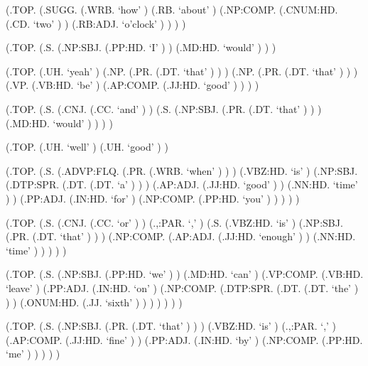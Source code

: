 \documentclass[10pt]{article}
\begin{document}
\begin{parsetree}  (.TOP. (.SUGG. (.WRB. `how' ) (.RB. `about' ) (.NP:COMP. (.CNUM:HD. (.CD. `two' ) ) (.RB:ADJ. `o'clock' ) ) ) ) \end{parsetree}

\begin{parsetree}  (.TOP. (.S. (.NP:SBJ. (.PP:HD. `I' ) ) (.MD:HD. `would' ) ) ) \end{parsetree}

\begin{parsetree}  (.TOP. (.UH. `yeah' ) (.NP. (.PR. (.DT. `that' ) ) ) (.NP. (.PR. (.DT. `that' ) ) ) (.VP. (.VB:HD. `be' ) (.AP:COMP. (.JJ:HD. `good' ) ) ) ) \end{parsetree}

\begin{parsetree}  (.TOP. (.S. (.CNJ. (.CC. `and' ) ) (.S. (.NP:SBJ. (.PR. (.DT. `that' ) ) ) (.MD:HD. `would' ) ) ) ) \end{parsetree}

\begin{parsetree}  (.TOP. (.UH. `well' ) (.UH. `good' ) ) \end{parsetree}

\begin{parsetree}  (.TOP. (.S. (.ADVP:FLQ. (.PR. (.WRB. `when' ) ) ) (.VBZ:HD. `is' ) (.NP:SBJ. (.DTP:SPR. (.DT. (.DT. `a' ) ) ) (.AP:ADJ. (.JJ:HD. `good' ) ) (.NN:HD. `time' ) ) (.PP:ADJ. (.IN:HD. `for' ) (.NP:COMP. (.PP:HD. `you' ) ) ) ) ) \end{parsetree}

\begin{parsetree}  (.TOP. (.S. (.CNJ. (.CC. `or' ) ) (.,:PAR. `,' ) (.S. (.VBZ:HD. `is' ) (.NP:SBJ. (.PR. (.DT. `that' ) ) ) (.NP:COMP. (.AP:ADJ. (.JJ:HD. `enough' ) ) (.NN:HD. `time' ) ) ) ) ) \end{parsetree}

\begin{parsetree}  (.TOP. (.S. (.NP:SBJ. (.PP:HD. `we' ) ) (.MD:HD. `can' ) (.VP:COMP. (.VB:HD. `leave' ) (.PP:ADJ. (.IN:HD. `on' ) (.NP:COMP. (.DTP:SPR. (.DT. (.DT. `the' ) ) ) (.ONUM:HD. (.JJ. `sixth' ) ) ) ) ) ) ) \end{parsetree}

\begin{parsetree}  (.TOP. (.S. (.NP:SBJ. (.PR. (.DT. `that' ) ) ) (.VBZ:HD. `is' ) (.,:PAR. `,' ) (.AP:COMP. (.JJ:HD. `fine' ) ) (.PP:ADJ. (.IN:HD. `by' ) (.NP:COMP. (.PP:HD. `me' ) ) ) ) ) \end{parsetree}
\end{document}
